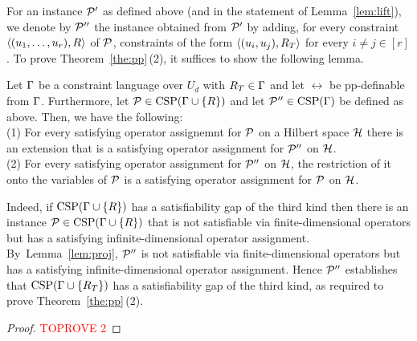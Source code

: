For an instance ${\mathcal P}'$ as defined above (and in the statement of Lemma~\ref{lem:lift}), we denote by ${\mathcal P}''$ the instance obtained from ${\mathcal P}'$ by adding, for every constraint $\langle (u _1,\ldots, u _{r}),R \rangle$ of ${\mathcal P}$, constraints of the form $\langle (u_i,u_j),R_T \rangle$ for every $i\neq j\in [r]$.
%
To prove Theorem~\ref{the:pp}\,(2), it suffices to show the following lemma.

\begin{lemma}\label{lem:proj}
  Let $\Gamma$ be a constraint language over $U_d$ with $R_T\in\Gamma$ and let $\rel$ be pp-definable
  from $\Gamma$. Furthermore, let ${\mathcal P}\in{\rm CSP}(\Gamma\cup\{R\})$ and let
  ${\mathcal P}''\in{\rm CSP}(\Gamma)$ be defined as above.  Then, we have the following:\\[2mm]
  (1) For every satisfying operator assignemnt for ${\mathcal P}$ on a Hilbert
  space ${\mathcal H}$ there is an extension that is a satisfying operator
  assignment for ${\mathcal P}''$ on ${\mathcal H}$.\\[2mm]
  (2) For every satisfying operator assignment for ${\mathcal P}''$ on ${\mathcal H}$, the
  restriction of it onto the variables of ${\mathcal P}$ is a satisfying operator
  assignment for ${\mathcal P}$ on ${\mathcal H}$.
\end{lemma}
%
Indeed, if ${\rm CSP}(\Gamma\cup\{R\})$ has a satisfiability gap of the
third kind then there is an instance ${\mathcal P}\in{\rm CSP}(\Gamma\cup\{R\})$ that is not
satisfiable via finite-dimensional operators but has a satisfying
infinite-dimensional operator assignment. By~Lemma~\ref{lem:proj}, ${\mathcal P}''$ is
not satisfiable via finite-dimensional operators but has a satisfying
infinite-dimensional operator assignment. Hence ${\mathcal P}''$ establishes that
${\rm CSP}(\Gamma\cup\{R_T\})$ has a satisfiability gap of the third kind, as required to prove Theorem~\ref{the:pp}\,(2).
%
\begin{proof}\textcolor{red}{TOPROVE 2}\end{proof}

